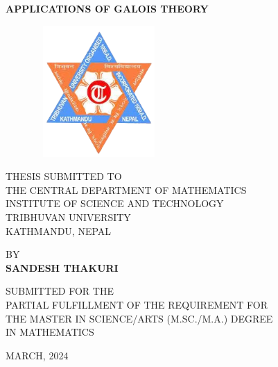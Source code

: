 \begin{center}
  {\LARGE
    {\bfseries{APPLICATIONS OF GALOIS THEORY}}}\\

  \vspace{1.5cm}

\begin{figure}[h]
	\centering
	\includegraphics[height=5cm,width=5cm]{pictures/tulogo.png}
\end{figure}

\vspace{2cm}

	THESIS SUBMITTED TO\\ THE
	 CENTRAL DEPARTMENT OF MATHEMATICS\\
	INSTITUTE OF SCIENCE AND TECHNOLOGY\\
	TRIBHUVAN UNIVERSITY \\
	KATHMANDU, NEPAL\\

\vspace{1.5cm}

	BY\\
	{\bfseries SANDESH THAKURI}

\vspace{1.5cm}

SUBMITTED FOR THE\\
PARTIAL FULFILLMENT OF THE REQUIREMENT FOR\\
THE MASTER IN SCIENCE/ARTS (M.SC./M.A.)  DEGREE\\
IN MATHEMATICS\\

\vspace{1.5cm}

MARCH, 2024

\end{center}

\thispagestyle{empty}

\clearpage